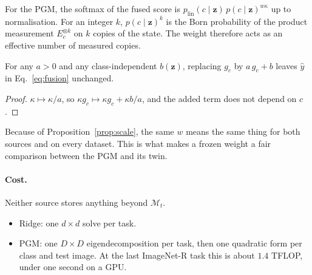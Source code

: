 For the PGM, the softmax of the fused score is
$p_{\mathrm{lin}}(c\mid\mathbf z)\,p(c\mid\mathbf z)^{w\kappa}$ up to normalisation. For
an integer $k$, $p(c\mid\mathbf z)^k$ is the Born probability of the product
measurement $E_c^{\otimes k}$ on $k$ copies of the state. The weight
therefore acts as an effective number of measured copies.

\begin{proposition}\label{prop:scale}
For any $a>0$ and any class-independent $b(\mathbf z)$, replacing $g_c$ by
$a\,g_c+b$ leaves $\hat y$ in Eq.~\eqref{eq:fusion} unchanged.
\end{proposition}
\begin{proof}
$\kappa\mapsto\kappa/a$, so $\kappa g_c\mapsto\kappa g_c+\kappa b/a$, and the
added term does not depend on $c$.
\end{proof}
\noindent Because of Proposition~\ref{prop:scale}, the same $w$ means the same
thing for both sources and on every dataset. This is what makes a frozen
weight a fair comparison between the PGM and its twin.

\paragraph{Cost.}
Neither source stores anything beyond $\mathcal M_t$.
\begin{itemize}
  \item Ridge: one $d\times d$ solve per task.
  \item PGM: one $D\times D$ eigendecomposition per task, then one quadratic
    form per class and test image. At the last ImageNet-R task this is
    about $1.4$ TFLOP, under one second on a GPU.
\end{itemize}
